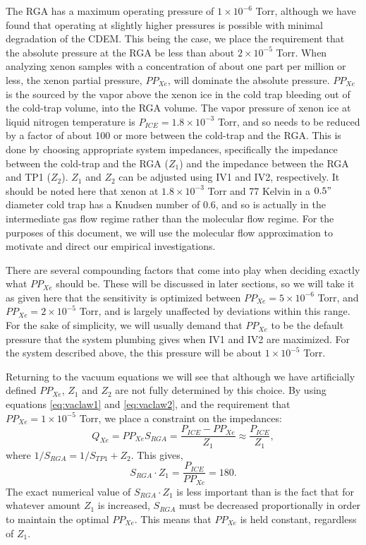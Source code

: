 \documentclass[12pt]{article}
\begin{document}
The RGA has a maximum operating pressure of $1\times 10^{-6}$ Torr, although we have found that operating at slightly higher pressures is possible with minimal degradation of the CDEM. This being the case, we place the requirement that the absolute pressure at the RGA be less than about $2\times 10^{-5}$ Torr. When analyzing xenon samples with a concentration of about one part per million or less, the xenon partial pressure, $PP_{Xe}$,  will dominate the absolute pressure. $PP_{Xe}$ is the sourced by the vapor above the xenon ice in the cold trap bleeding out of the cold-trap volume, into the RGA volume. The vapor pressure of xenon ice at liquid nitrogen temperature is $P_{ICE}=1.8\times 10^{-3}$ Torr, and so needs to be reduced by a factor of about 100 or more between the cold-trap and the RGA\cite{vaporpressure}. This is done by choosing appropriate system impedances, specifically the impedance between the cold-trap and the RGA ($Z_1$) and the impedance between the RGA and TP1 ($Z_2$). $Z_1$ and $Z_2$ can be adjusted using IV1 and IV2, respectively. It should be noted here that xenon at $1.8\times 10^{-3}$ Torr and 77 Kelvin in a $0.5"$ diameter cold trap has a Knudsen number of 0.6, and so is actually in the intermediate gas flow regime rather than the molecular flow regime\cite{vac_eq}. For the purposes of this document, we will use the molecular flow approximation to motivate and direct our empirical investigations.

There are several compounding factors that come into play when deciding exactly what $PP_{Xe}$ should be. These will be discussed in later sections, so we will take it as given here that the sensitivity is optimized between $PP_{Xe}=5\times10^{-6}$ Torr, and $PP_{Xe}=2\times10^{-5}$ Torr, and is largely unaffected by deviations within this range. For the sake of simplicity, we will usually demand that $PP_{Xe}$ to be the default pressure that the system plumbing gives when IV1 and IV2 are maximized. For the system described above, the this pressure will be about $1\times 10^{-5}$ Torr. 

Returning to the vacuum equations we will see that although we have artificially defined $PP_{Xe}$, $Z_1$ and $Z_2$ are not fully determined by this choice. By using equations \ref{eq:vaclaw1} and \ref{eq:vaclaw2}, and the requirement that $PP_{Xe}=1\times 10^{-5}$ Torr, we place a constraint on the impedances:
\begin{equation}
\label{eq:xepres1}
Q_{Xe}=PP_{Xe}S_{RGA}=\frac{P_{ICE}-PP_{Xe}}{Z_1}\approx \frac{P_{ICE}}{Z_1},
\end{equation}
where $1/S_{RGA}=1/S_{TP1}+Z_2$. This gives,
\begin{equation}
\label{eq:impconstraint}
S_{RGA}\cdot Z_1= \frac{P_{ICE}}{PP_{Xe}} = 180.
\end{equation}
The exact numerical value of $S_{RGA}\cdot Z_1$ is less important than is the fact that for whatever amount $Z_1$ is increased, $S_{RGA}$ must be decreased proportionally in order to maintain the optimal $PP_{Xe}$. This means that $PP_{Xe}$ is held constant, regardless of $Z_1$.
\end{document}
